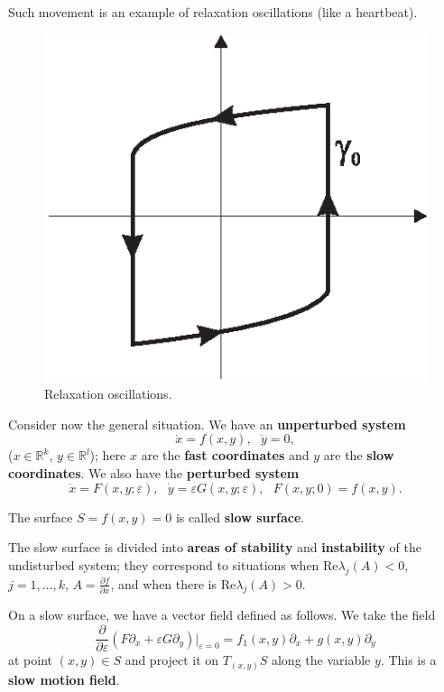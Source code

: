 \begin{example}
	Such movement is an example of relaxation oscillations (like a heartbeat).
	\begin{figure}[!ht]
		\centering
		\includegraphics [scale=1.4]{jtr45}
		\caption{Relaxation oscillations.}
		\label{fig:4.5}
	\end{figure}
\end{example}

Consider now the general situation. We have an \textbf{unperturbed system}
$$
\dot{x}=f(x,y),\text{ \ \ \ }\dot{y}=0,
$$%
($x\in \mathbb{R}^{k}$, $y\in \mathbb{R}^{l}$); here $x$ are the \textbf{fast coordinates} and $y$ are the \textbf{slow coordinates}. We also have the \textbf{perturbed system}
$$
\dot{x}=F(x,y;\varepsilon ),\text{ \ \ }\dot{y}=\varepsilon
G(x,y;\varepsilon ),\text{ \ \ \ }F(x,y;0)=f(x,y).
$$

\begin{definition}
	The surface $S = {f (x, y) = 0}$ is called  \textbf{slow surface}.
	
	The slow surface is divided into \textbf{areas of stability} and \textbf{instability} of the undisturbed system; they correspond to situations when $\textrm{Re}\lambda _{j}(A)<0$, $j=1,\ldots ,k$, $A=\frac{\partial f}{\partial x}$, and when there is $\textrm{Re}\lambda _{j}(A)>0$.
	
	On a slow surface, we have a vector field defined as follows. We take the field
	$$
	\frac{\partial }{\partial \varepsilon }\left( F\partial _{x}+\varepsilon
	G\partial _{y}\right) |_{\varepsilon =0}=f_{1}(x,y)\partial
	_{x}+g(x,y)\partial _{y}
	$$
	at point $\left( x,y\right) \in S$ and project it on $T_{(x,y)}S$ along the variable $y$. This is a \textbf{slow motion field}.
\end{definition}

